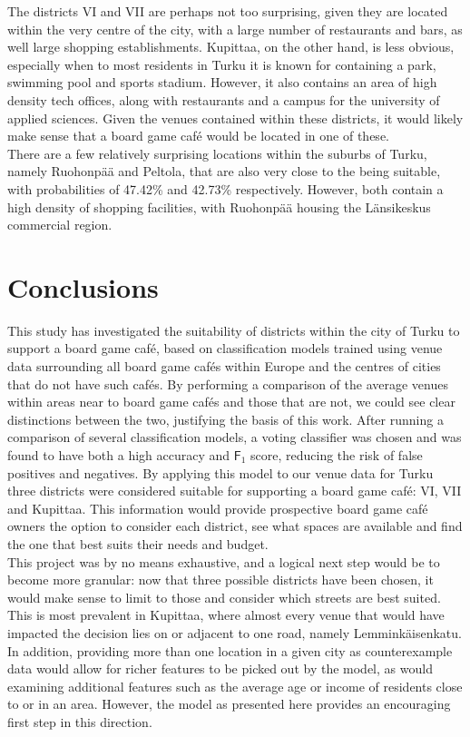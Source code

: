 \documentclass{article}
\begin{document}
    The districts VI and VII are perhaps not too surprising, given they are located within the very centre of the city, with a large number of restaurants and bars, as well large shopping establishments.
    Kupittaa, on the other hand, is less obvious, especially when to most residents in Turku it is known for containing a park, swimming pool and sports stadium.
    However, it also contains an area of high density tech offices, along with restaurants and a campus for the university of applied sciences.
    Given the venues contained within these districts, it would likely make sense that a board game caf\'e would be located in one of these. \\

    There are a few relatively surprising locations within the suburbs of Turku, namely Ruohonp\"a\"a and Peltola, that are also very close to the being suitable, with probabilities of 47.42\% and 42.73\% respectively. 
    However, both contain a high density of shopping facilities, with Ruohonp\"a\"a housing the L\"ansikeskus commercial region.

    \section{Conclusions}

    This study has investigated the suitability of districts within the city of Turku to support a board game caf\'e, based on classification models trained using venue data surrounding all board game caf\'es within Europe and the centres of cities that do not have such caf\'es. 
    By performing a comparison of the average venues within areas near to board game caf\'es and those that are not, we could see clear distinctions between the two, justifying the basis of this work.
    After running a comparison of several classification models, a voting classifier was chosen and was found to have both a high accuracy and $\mathsf{F}_1$ score, reducing the risk of false positives and negatives.
    By applying this model to our venue data for Turku three districts were considered suitable for supporting a board game caf\'e: VI, VII and Kupittaa.
    This information would provide prospective board game caf\'e owners the option to consider each district, see what spaces are available and find the one that best suits their needs and budget.\\

    This project was by no means exhaustive, and a logical next step would be to become more granular: now that three possible districts have been chosen, it would make sense to limit to those and consider which streets are best suited.
    This is most prevalent in Kupittaa, where almost every venue that would have impacted the decision lies on or adjacent to one road, namely Lemmink\"aisenkatu.
    In addition, providing more than one location in a given city as counterexample data would allow for richer features to be picked out by the model, as would examining additional features such as the average age or income of residents close to or in an area.
    However, the model as presented here provides an encouraging first step in this direction.
\end{document}
